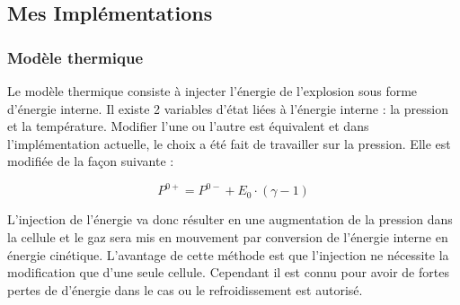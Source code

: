 %

\subsection{Mes Implémentations}
\label{sec:SNmodel}

\subsubsection{Modèle thermique}
Le modèle thermique consiste à injecter l’énergie de l'explosion sous forme d’énergie interne.
Il existe 2 variables d’état liées à l’énergie interne : la pression et la température.
Modifier l'une ou l'autre est équivalent et dans l’implémentation actuelle, le choix a été fait de travailler sur la pression.
Elle est modifiée de la façon suivante :

\begin{equation}
P^{0+} = P^{0-}  + E_0 \cdot  (\gamma-1)
\end{equation}

L'injection de l'énergie va donc résulter en une augmentation de la pression dans la cellule et le gaz sera mis en mouvement par conversion de l'énergie interne en énergie cinétique. 
L'avantage de cette méthode est que l'injection ne nécessite la modification que d'une seule cellule.
Cependant il est connu pour avoir de fortes pertes de d'énergie dans le cas ou le refroidissement est autorisé.

